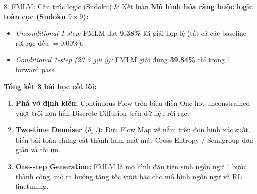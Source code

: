 \begin{frame}{8. FMLM: Cấu trúc logic (Sudoku) \& Kết luận}
    \textbf{Mô hình hóa ràng buộc logic toàn cục (Sudoku $9 \times 9$):}
    \begin{itemize}
        \item \textit{Unconditional 1-step:} FMLM đạt \textbf{9.38\%} lời giải hợp lệ (tất cả các baseline rời rạc đều $= 0.00\%$).
        \item \textit{Conditional 1-step (20 ô gợi ý):} FMLM giải đúng \textbf{39.84\%} chỉ trong 1 forward pass.
    \end{itemize}
    \vspace{0.2cm}
    \textbf{Tổng kết 3 bài học cốt lõi:}
    \begin{enumerate}
        \item \textbf{Phá vỡ định kiến:} Continuous Flow trên biểu diễn One-hot unconstrained vượt trội hơn hẳn Discrete Diffusion trên dữ liệu rời rạc.
        \item \textbf{Two-time Denoiser ($\delta_{s,t}$):} Đưa Flow Map về nằm trên đơn hình xác suất, biến bài toán chưng cất thành hàm mất mát Cross-Entropy / Semigroup đơn giản và tối ưu.
        \item \textbf{One-step Generation:} FMLM là mô hình đầu tiên sinh ngôn ngữ 1 bước thành công, mở ra hướng tăng tốc vượt bậc cho mô hình ngôn ngữ và RL finetuning.
    \end{enumerate}
\end{frame}

